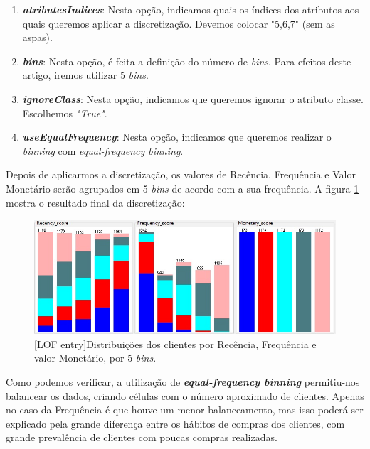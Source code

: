 \documentclass{easychair}
\begin{document}
\begin{enumerate}
    \item \textbf{\textit{atributesIndices}}: Nesta opção, indicamos quais os índices dos atributos aos quais queremos aplicar a discretização. Devemos colocar "5,6,7" (sem as aspas).
    \item \textbf{\textit{bins}}: Nesta opção, é feita a definição do número de \textit{bins}. Para efeitos deste artigo, iremos utilizar 5 \textit{bins}.
    \item \textbf{\textit{ignoreClass}}: Nesta opção, indicamos que queremos ignorar o atributo classe. Escolhemos \textit{"True"}.
    \item \textbf{\textit{useEqualFrequency}}: Nesta opção, indicamos que queremos realizar o \textit{binning} com \textit{equal-frequency binning}.
\end{enumerate}

\newpage

Depois de aplicarmos a discretização, os valores de Recência, Frequência e Valor Monetário serão agrupados em 5 \textit{bins} de acordo com a sua frequência. A figura \ref{fig8} mostra o resultado final da discretização:

\begin{figure}[H]
    \begin{centering}
    \includegraphics[width=1\linewidth]{imagens/figure8.jpg}\label{cap-4-fig8}
    [LOF entry]{Distribuições dos clientes por Recência, Frequência e valor Monetário, por 5 \textit{bins}.}
    \label{fig8}
    \end{centering}
\end{figure}

Como podemos verificar, a utilização de \textit{\textbf{equal-frequency binning}} permitiu-nos balancear os dados, criando células com o número aproximado de clientes. Apenas no caso da Frequência é que houve um menor balanceamento, mas isso poderá ser explicado pela grande diferença entre os hábitos de compras dos clientes, com grande prevalência de clientes com poucas compras realizadas.
\end{document}
